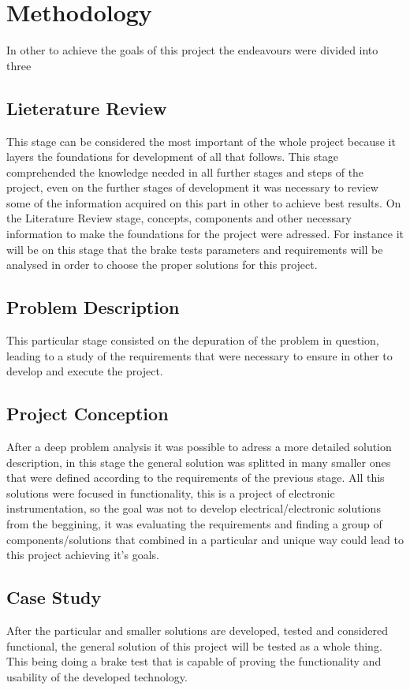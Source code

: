 \chapter{Methodology}

	In other to achieve the goals of this project the endeavours were divided into three 

	\section{Lieterature Review}
		This stage can be considered the most important of the whole project because it layers the foundations for development of all that follows. This stage comprehended the knowledge needed in all further stages and steps of the project, even on the further stages of development it was necessary to review some of the information acquired on this part in other to achieve best results. On the Literature Review stage, concepts, components and other necessary information to make the foundations for the project were adressed. For instance it will be on this stage that the brake tests parameters and requirements will be analysed in order to choose the proper solutions for this project.

	\section{Problem Description}
		This particular stage consisted on the depuration of the problem in question, leading to a study of the requirements that were necessary to ensure in other to develop and execute the project. 

	\section{Project Conception}
		After a deep problem analysis it was possible to adress a more detailed solution description, in this stage the general solution was splitted in many smaller ones that were defined according to the requirements of the previous stage. All this solutions were focused in functionality, this is a project of electronic instrumentation, so the goal was not to develop electrical/electronic solutions from the beggining, it was evaluating the requirements and finding a group of components/solutions that combined in a particular and unique way could lead to this project achieving it's goals.
		
	\section{Case Study}
		After the particular and smaller solutions are developed, tested and considered functional, the general solution of this project will be tested as a whole thing. This being doing a brake test that is capable of proving the functionality and usability of the developed technology.
